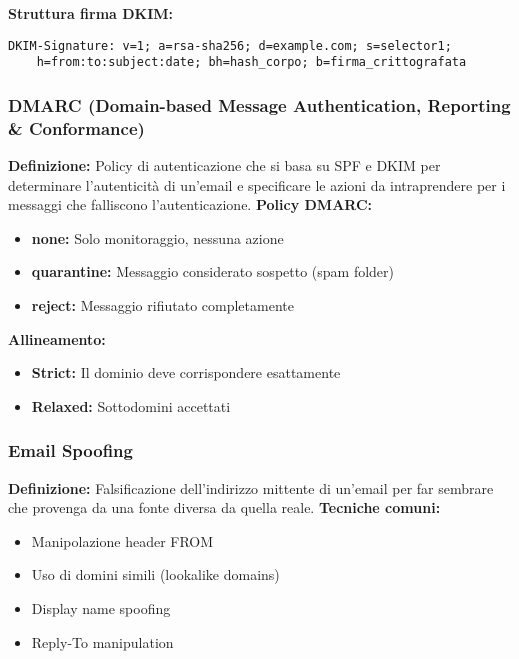 \documentclass{article}
\begin{document}
\textbf{Struttura firma DKIM:}
\begin{lstlisting}[caption=Struttura firma DKIM]
DKIM-Signature: v=1; a=rsa-sha256; d=example.com; s=selector1;
    h=from:to:subject:date; bh=hash_corpo; b=firma_crittografata
\end{lstlisting}

\subsubsection{DMARC (Domain-based Message Authentication, Reporting \& Conformance)}
\textbf{Definizione:} Policy di autenticazione che si basa su SPF e DKIM per determinare l'autenticità di un'email e specificare le azioni da intraprendere per i messaggi che falliscono l'autenticazione.
\newline \newline
\textbf{Policy DMARC:}
\begin{itemize}
    \item \textbf{none:} Solo monitoraggio, nessuna azione
    \item \textbf{quarantine:} Messaggio considerato sospetto (spam folder)
    \item \textbf{reject:} Messaggio rifiutato completamente
\end{itemize}

\textbf{Allineamento:}
\begin{itemize}
    \item \textbf{Strict:} Il dominio deve corrispondere esattamente
    \item \textbf{Relaxed:} Sottodomini accettati
\end{itemize}

\subsubsection{Email Spoofing}
\textbf{Definizione:} Falsificazione dell'indirizzo mittente di un'email per far sembrare che provenga da una fonte diversa da quella reale.
\newline \newline
\textbf{Tecniche comuni:}
\begin{itemize}
    \item Manipolazione header FROM
    \item Uso di domini simili (lookalike domains)
    \item Display name spoofing
    \item Reply-To manipulation
\end{itemize}
\end{document}
